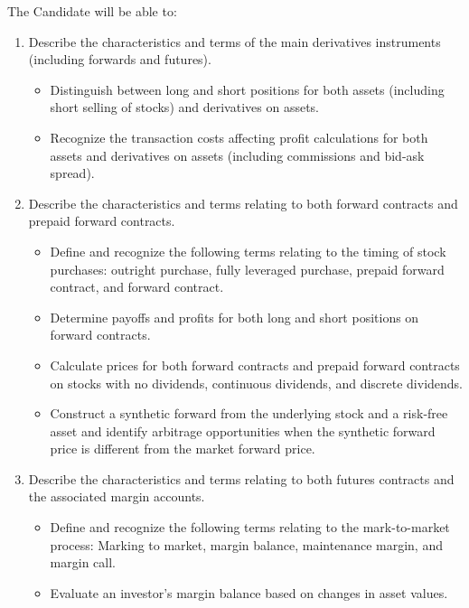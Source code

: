 \begin{outcomes}
The Candidate will be able to:
\begin{enumerate}[label = \alph*)]
	\item	Describe the characteristics and terms of the main derivatives instruments (including forwards and futures).
		\begin{knowledge}[]
		\begin{itemize}
		\item	Distinguish between long and short positions for both assets (including short selling of stocks) and derivatives on assets.
		\item	Recognize the transaction costs affecting profit calculations for both assets and derivatives on assets (including commissions and bid-ask spread).
		\end{itemize}
		\end{knowledge}
	\item	Describe the characteristics and terms relating to both forward contracts and prepaid forward contracts.
		\begin{knowledge}[]
		\begin{itemize}
		\item	Define and recognize the following terms relating to the timing of stock purchases: outright purchase, fully leveraged purchase, prepaid forward contract, and forward contract.
		\item	Determine payoffs and profits for both long and short positions on forward contracts.
		\item	Calculate prices for both forward contracts and prepaid forward contracts on stocks with no dividends, continuous dividends, and discrete dividends. 
		\item	Construct a synthetic forward from the underlying stock and a risk-free asset and identify arbitrage opportunities when the synthetic forward price is different from the market forward price.
		\end{itemize}
		\end{knowledge}
	\item	Describe the characteristics and terms relating to both futures contracts and the associated margin accounts.
		\begin{knowledge}[]
		\begin{itemize}
		\item	Define and recognize the following terms relating to the mark-to-market process: Marking to market, margin balance, maintenance margin, and margin call. 
		\item	Evaluate an investor’s margin balance based on changes in asset values.
		\end{itemize}
		\end{knowledge}
	\end{enumerate}
\end{outcomes}

